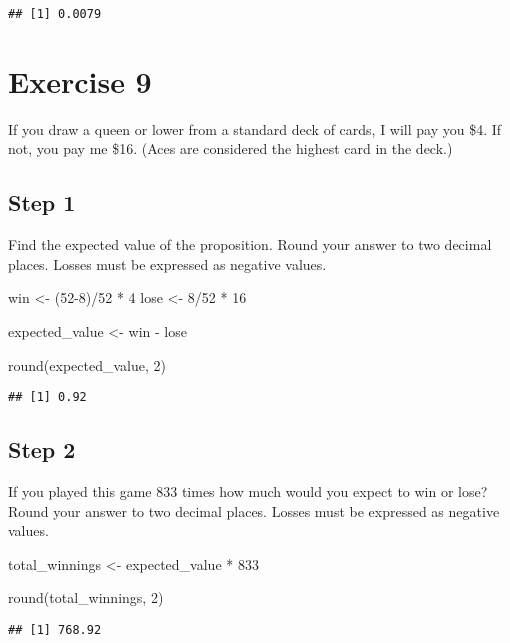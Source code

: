 \documentclass[
]{article}
\newenvironment{Shaded}{\begin{snugshade}}{\end{snugshade}}
\newcommand{\DecValTok}[1]{\textcolor[rgb]{0.00,0.00,0.81}{#1}}
\newcommand{\FunctionTok}[1]{\textcolor[rgb]{0.00,0.00,0.00}{#1}}
\newcommand{\NormalTok}[1]{#1}
\newcommand{\OtherTok}[1]{\textcolor[rgb]{0.56,0.35,0.01}{#1}}
\newcommand{\SpecialCharTok}[1]{\textcolor[rgb]{0.00,0.00,0.00}{#1}}
\begin{document}
\begin{verbatim}
## [1] 0.0079
\end{verbatim}

\hypertarget{exercise-9}{%
\section{Exercise 9}\label{exercise-9}}

If you draw a queen or lower from a standard deck of cards, I will pay
you \$4. If not, you pay me \$16. (Aces are considered the highest card
in the deck.)

\hypertarget{step-1-2}{%
\subsection{Step 1}\label{step-1-2}}

Find the expected value of the proposition. Round your answer to two
decimal places. Losses must be expressed as negative values.

\begin{Shaded}
\begin{Highlighting}[]
\NormalTok{win }\OtherTok{\textless{}{-}}\NormalTok{ (}\DecValTok{52{-}8}\NormalTok{)}\SpecialCharTok{/}\DecValTok{52} \SpecialCharTok{*} \DecValTok{4}
\NormalTok{lose }\OtherTok{\textless{}{-}} \DecValTok{8}\SpecialCharTok{/}\DecValTok{52} \SpecialCharTok{*} \DecValTok{16}

\NormalTok{expected\_value }\OtherTok{\textless{}{-}}\NormalTok{ win }\SpecialCharTok{{-}}\NormalTok{ lose}

\FunctionTok{round}\NormalTok{(expected\_value, }\DecValTok{2}\NormalTok{)}
\end{Highlighting}
\end{Shaded}

\begin{verbatim}
## [1] 0.92
\end{verbatim}

\hypertarget{step-2-2}{%
\subsection{Step 2}\label{step-2-2}}

If you played this game 833 times how much would you expect to win or
lose? Round your answer to two decimal places. Losses must be expressed
as negative values.

\begin{Shaded}
\begin{Highlighting}[]
\NormalTok{total\_winnings }\OtherTok{\textless{}{-}}\NormalTok{ expected\_value }\SpecialCharTok{*} \DecValTok{833}

\FunctionTok{round}\NormalTok{(total\_winnings, }\DecValTok{2}\NormalTok{)}
\end{Highlighting}
\end{Shaded}

\begin{verbatim}
## [1] 768.92
\end{verbatim}
\end{document}
